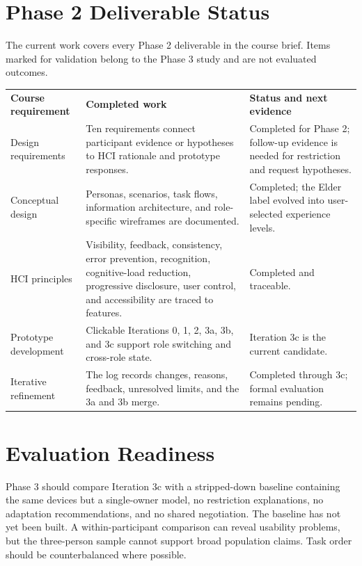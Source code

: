 \documentclass[11pt,letterpaper]{article}
\newcommand{\thead}[1]{\cellcolor{SharedNavy}\color{white}\bfseries #1}
\begin{document}
\section{Phase 2 Deliverable Status}

The current work covers every Phase 2 deliverable in the course brief. Items marked for
validation belong to the Phase 3 study and are not evaluated outcomes.

\small
{}
\begin{tabularx}{\textwidth}{P{1.35in} Y P{2.05in}}
  \thead{Course requirement} & \thead{Completed work} & \thead{Status and next evidence}\\
  Design requirements & Ten requirements connect participant evidence or hypotheses to HCI rationale and prototype responses. & Completed for Phase 2; follow-up evidence is needed for restriction and request hypotheses.\\
  Conceptual design & Personas, scenarios, task flows, information architecture, and role-specific wireframes are documented. & Completed; the Elder label evolved into user-selected experience levels.\\
  HCI principles & Visibility, feedback, consistency, error prevention, recognition, cognitive-load reduction, progressive disclosure, user control, and accessibility are traced to features. & Completed and traceable.\\
  Prototype development & Clickable Iterations 0, 1, 2, 3a, 3b, and 3c support role switching and cross-role state. & Iteration 3c is the current candidate.\\
  Iterative refinement & The log records changes, reasons, feedback, unresolved limits, and the 3a and 3b merge. & Completed through 3c; formal evaluation remains pending.\\
\end{tabularx}
\normalsize

\section{Evaluation Readiness}

Phase 3 should compare Iteration 3c with a stripped-down baseline containing the same devices
but a single-owner model, no restriction explanations, no adaptation recommendations, and no
shared negotiation. The baseline has not yet been built. A within-participant comparison can
reveal usability problems, but the three-person sample cannot support broad population claims.
Task order should be counterbalanced where possible.
\end{document}
